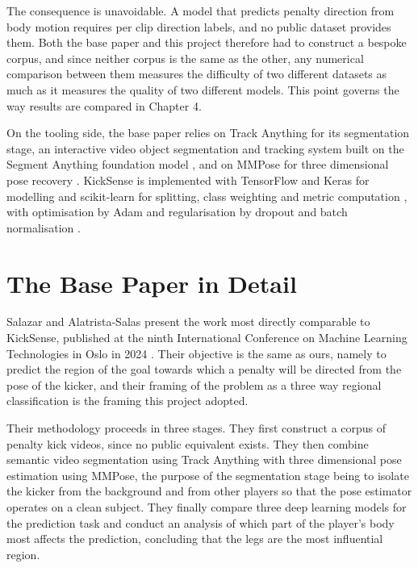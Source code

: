 The consequence is unavoidable. A model that predicts penalty direction from body motion requires per clip direction labels, and no public dataset provides them. Both the base paper and this project therefore had to construct a bespoke corpus, and since neither corpus is the same as the other, any numerical comparison between them measures the difficulty of two different datasets as much as it measures the quality of two different models. This point governs the way results are compared in Chapter 4.

On the tooling side, the base paper relies on Track Anything for its segmentation stage, an interactive video object segmentation and tracking system built on the Segment Anything foundation model \cite{yang2023,kirillov2023}, and on MMPose for three dimensional pose recovery \cite{mmpose2020}. KickSense is implemented with TensorFlow and Keras for modelling \cite{abadi2016} and scikit-learn for splitting, class weighting and metric computation \cite{pedregosa2011}, with optimisation by Adam \cite{kingma2015} and regularisation by dropout and batch normalisation \cite{srivastava2014,ioffe2015}.

\section{The Base Paper in Detail}

Salazar and Alatrista-Salas present the work most directly comparable to KickSense, published at the ninth International Conference on Machine Learning Technologies in Oslo in 2024 \cite{salazar2024}. Their objective is the same as ours, namely to predict the region of the goal towards which a penalty will be directed from the pose of the kicker, and their framing of the problem as a three way regional classification is the framing this project adopted.

Their methodology proceeds in three stages. They first construct a corpus of penalty kick videos, since no public equivalent exists. They then combine semantic video segmentation using Track Anything with three dimensional pose estimation using MMPose, the purpose of the segmentation stage being to isolate the kicker from the background and from other players so that the pose estimator operates on a clean subject. They finally compare three deep learning models for the prediction task and conduct an analysis of which part of the player's body most affects the prediction, concluding that the legs are the most influential region.

